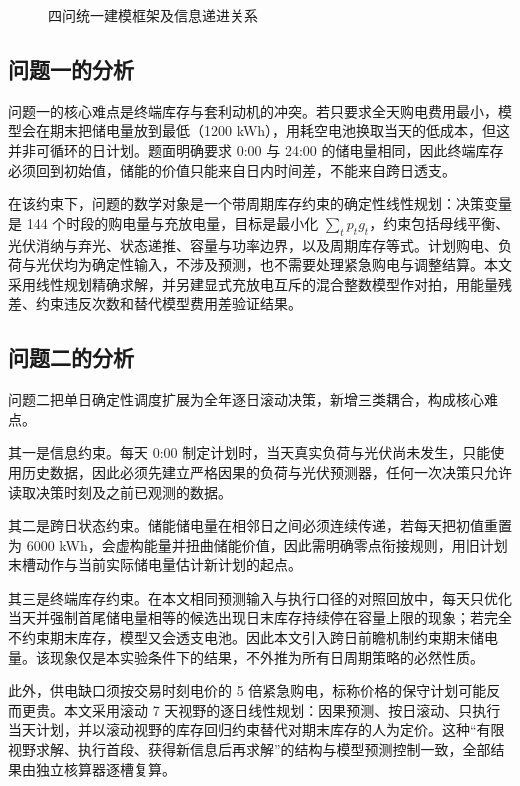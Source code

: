 \documentclass[withoutpreface,bwprint]{cumcmthesis}
\begin{document}
\begin{figure}[htbp]
\centering

\caption{四问统一建模框架及信息递进关系}
\label{fig:overall_framework}
\end{figure}


\subsection{问题一的分析}

问题一的核心难点是终端库存与套利动机的冲突。若只要求全天购电费用最小，模型会在期末把储电量放到最低（1200 kWh），用耗空电池换取当天的低成本，但这并非可循环的日计划。题面明确要求 0:00 与 24:00 的储电量相同，因此终端库存必须回到初始值，储能的价值只能来自日内时间差，不能来自跨日透支。

在该约束下，问题的数学对象是一个带周期库存约束的确定性线性规划：决策变量是 144 个时段的购电量与充放电量，目标是最小化 $\sum_t p_t g_t$，约束包括母线平衡、光伏消纳与弃光、状态递推、容量与功率边界，以及周期库存等式。计划购电、负荷与光伏均为确定性输入，不涉及预测，也不需要处理紧急购电与调整结算。本文采用线性规划精确求解，并另建显式充放电互斥的混合整数模型作对拍，用能量残差、约束违反次数和替代模型费用差验证结果。

\subsection{问题二的分析}

问题二把单日确定性调度扩展为全年逐日滚动决策，新增三类耦合，构成核心难点。

其一是信息约束。每天 0:00 制定计划时，当天真实负荷与光伏尚未发生，只能使用历史数据，因此必须先建立严格因果的负荷与光伏预测器，任何一次决策只允许读取决策时刻及之前已观测的数据。

其二是跨日状态约束。储能储电量在相邻日之间必须连续传递，若每天把初值重置为 6000 kWh，会虚构能量并扭曲储能价值，因此需明确零点衔接规则，用旧计划末槽动作与当前实际储电量估计新计划的起点。

其三是终端库存约束。在本文相同预测输入与执行口径的对照回放中，每天只优化当天并强制首尾储电量相等的候选出现日末库存持续停在容量上限的现象；若完全不约束期末库存，模型又会透支电池。因此本文引入跨日前瞻机制约束期末储电量。该现象仅是本实验条件下的结果，不外推为所有日周期策略的必然性质。

此外，供电缺口须按交易时刻电价的 5 倍紧急购电，标称价格的保守计划可能反而更贵。本文采用滚动 7 天视野的逐日线性规划：因果预测、按日滚动、只执行当天计划，并以滚动视野的库存回归约束替代对期末库存的人为定价。这种“有限视野求解、执行首段、获得新信息后再求解”的结构与模型预测控制一致\cite{rawlings2017mpc}，全部结果由独立核算器逐槽复算。
\end{document}

